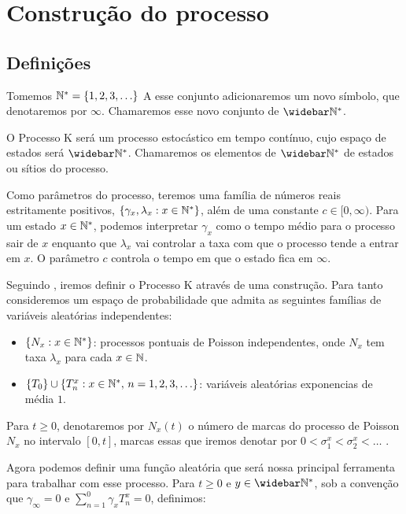 \chapter{Construção do processo}
\label{cap:construcao}

\section{Definições}
\label{sec:definicoes}

Tomemos ${\mathbb{N^*}} = \{ 1, 2, 3, \ldots\}$ A esse conjunto adicionaremos um
novo símbolo, que denotaremos por $\infty$. Chamaremos esse novo
conjunto de $\Nzb$.

O Processo K será um processo estocástico em tempo contínuo, cujo
espaço de estados será $\Nzb$. Chamaremos os elementos de $\Nzb$ de
estados ou sítios do processo.

Como parâmetros do processo, teremos uma família de números reais
estritamente positivos, $\{\gamma_x, \lambda_x : x \in {\mathbb{N^*}}\}$, além de
uma constante $c \in [0, \infty)$.  Para um estado $x \in {\mathbb{N^*}}$,
podemos interpretar $\gamma_x$ como o tempo médio para o processo sair
de $x$ enquanto que $\lambda_x$ vai controlar a taxa com que o
processo tende a entrar em $x$. O parâmetro $c$ controla o tempo em
que o estado fica em $\infty$.

Seguindo \cite{fontes:08}, iremos definir o Processo K através de uma
construção. Para tanto consideremos um espaço de probabilidade que
admita as seguintes famílias de variáveis aleatórias independentes:

\begin{itemize}
\item $\{ N_x: x \in {\mathbb{N^*}} \}$: processos pontuais de Poisson
  independentes, onde $N_x$ tem taxa $\lambda_x$ para cada $x \in {\mathbb{N}}$.
\item $\{T_0\} \cup \{T_n^x: x \in {\mathbb{N^*}} , \, n = 1, 2, 3, \ldots \}$:
  variáveis aleatórias exponencias de média $1$.
\end{itemize}

Para $t \geq 0$, denotaremos por $N_x(t)$ o número de marcas do
processo de Poisson $N_x$ no intervalo $[0, t]$, marcas essas que
iremos denotar por $0 < \sigma_1^x < \sigma_2^x < \ldots$ .

Agora podemos definir uma função aleatória que será nossa principal
ferramenta para trabalhar com esse processo. Para $t \geq 0$ e $y \in
\Nzb$, sob a convenção que $\gamma_\infty = 0$ e $\sum_{n=1}^{0}
\gamma_x T_n^x = 0$, definimos:

